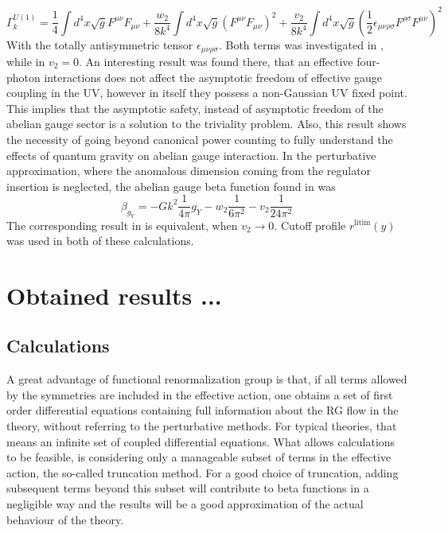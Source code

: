 \documentclass[11pt, a4paper]{article}
\begin{document}
\begin{equation}
    \Gamma^{U(1)}_k = \frac{1}{4} \int d^4 x \sqrt{g} F^{\mu\nu} F_{\mu\nu} + \frac{w_2}{8 k^4} \int d^4 x \sqrt{g} \left(F^{\mu\nu} F_{\mu\nu}\right)^2 + \frac{v_2}{8k^4} \int d^4 x \sqrt{g} \left( \frac{1}{2} \epsilon_{\mu\nu\rho\sigma} F^{\rho\sigma} F^{\mu\nu} \right)^2
\end{equation}
With the totally antisymmetric tensor $\epsilon_{\mu\nu\rho\sigma}$.
Both terms was investigated in \cite{kwapisz_eichhorn}, while in \cite{christiansen_eichhorn} $v_2 = 0$.
An interesting result was found there, that an effective four-photon interactions does not affect the asymptotic freedom of effective gauge coupling
in the UV, however in itself they possess a non-Gaussian UV fixed point. This implies that the asymptotic safety, instead of asymptotic freedom
of the abelian gauge sector is a solution to the triviality problem. Also, this result shows
the necessity of going beyond canonical power counting to fully understand the effects of quantum gravity on abelian gauge interaction.
In the perturbative approximation, where the anomalous dimension coming from the regulator insertion is neglected,
the abelian gauge beta function found in \cite{kwapisz_eichhorn} was
\begin{equation}
    \beta_{g_Y} = - Gk^2 \frac{1}{4\pi} g_Y - w_2 \frac{1}{6\pi^2} - v_2 \frac{1}{24\pi^2}
\end{equation}
The corresponding result in \cite{christiansen_eichhorn} is equivalent, when $v_2 \rightarrow 0$.
Cutoff profile $r^{\text{litim}}(y)$ was used in both of these calculations.

\section{Obtained results ...}

\subsection{Calculations}

A great advantage of functional renormalization group is that, if all terms
allowed by the symmetries are included in the effective action, one obtains a set of first order
differential equations containing full information about the RG flow in the theory, without referring to the perturbative methods.
For typical theories, that means an infinite set of coupled differential equations.
What allows calculations to be feasible, is considering only a manageable subset of terms in the effective action, the so-called truncation method.
For a good choice of truncation, adding subsequent terms beyond this subset will contribute to beta functions in a negligible way
and the results will be a good approximation of the actual behaviour of the theory.
\end{document}

